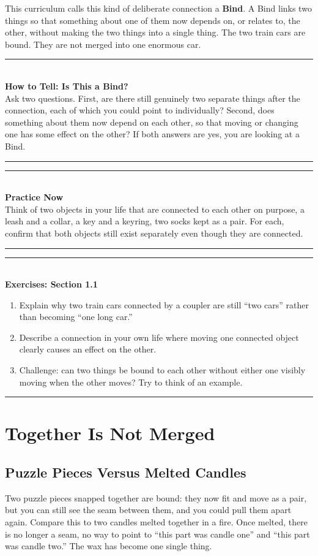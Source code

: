 \documentclass[11pt]{book}
\newenvironment{algorithmproc}[1]{\vspace{0.6em}\noindent\rule{\linewidth}{0.6pt}\\[0.2em]\textbf{How to Tell: #1}\\[0.3em]}{\\[0.2em]\noindent\rule{\linewidth}{0.6pt}\vspace{0.6em}}
\newenvironment{practicenow}{\vspace{0.6em}\noindent\rule{\linewidth}{0.6pt}\\[0.2em]\textbf{Practice Now}\\[0.3em]}{\\[0.2em]\noindent\rule{\linewidth}{0.6pt}\vspace{0.6em}}
\newenvironment{exercisebox}[1]{\vspace{0.8em}\noindent\rule{\linewidth}{0.6pt}\\[0.2em]\textbf{Exercises: #1}\\[0.3em]\begin{enumerate}[label=\arabic*., itemsep=0.4em]}{\end{enumerate}\noindent\rule{\linewidth}{0.6pt}\vspace{0.6em}}
\begin{document}
This curriculum calls this kind of deliberate connection a \textbf{Bind}. A Bind links two things so that something about one of them now depends on, or relates to, the other, without making the two things into a single thing. The two train cars are bound. They are not merged into one enormous car.

\begin{algorithmproc}{Is This a Bind?}
Ask two questions. First, are there still genuinely two separate things after the connection, each of which you could point to individually? Second, does something about them now depend on each other, so that moving or changing one has some effect on the other? If both answers are yes, you are looking at a Bind.
\end{algorithmproc}

\begin{practicenow}
Think of two objects in your life that are connected to each other on purpose, a leash and a collar, a key and a keyring, two socks kept as a pair. For each, confirm that both objects still exist separately even though they are connected.
\end{practicenow}

\begin{exercisebox}{Section 1.1}
\item Explain why two train cars connected by a coupler are still ``two cars'' rather than becoming ``one long car.''
\item Describe a connection in your own life where moving one connected object clearly causes an effect on the other.
\item Challenge: can two things be bound to each other without either one visibly moving when the other moves? Try to think of an example.
\end{exercisebox}

\chapter{Together Is Not Merged}

\section{Puzzle Pieces Versus Melted Candles}

Two puzzle pieces snapped together are bound: they now fit and move as a pair, but you can still see the seam between them, and you could pull them apart again. Compare this to two candles melted together in a fire. Once melted, there is no longer a seam, no way to point to ``this part was candle one'' and ``this part was candle two.'' The wax has become one single thing.
\end{document}
